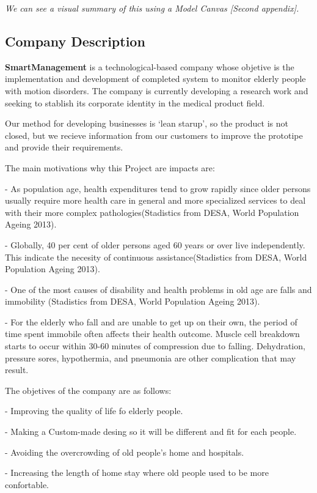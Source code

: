\textit{We can see a visual summary of this using a Model Canvas [Second appendix].}

\subsection{Company Description}
\textbf{SmartManagement} is a technological-based company whose objetive is the implementation and development of completed system to monitor elderly people with motion disorders. The company is currently developing a research work and seeking to stablish its corporate identity in the medical product field.

Our method for developing businesses is ‘lean starup’, so the product is not closed, but we recieve information from our customers to improve the prototipe and provide their requirements.

The main motivations why this Project are impacts are:

-	As population age, health expenditures tend to grow rapidly since older persons usually require more health care in general and more specialized services to deal with their more complex pathologies(Stadistics from DESA,  World Population Ageing 2013\cite{desa}).

-	Globally, 40 per cent of older persons aged 60 years or over live independently. This indicate the necesity of continuous assistance(Stadistics from DESA,  World Population Ageing 2013\cite{desa}).

-	One of the most causes of disability and health problems in old age are falls and immobility (Stadistics from DESA,  World Population Ageing 2013\cite{desa}).

-	For the elderly who fall and are unable to get up on their own, the period of time spent immobile often affects their health outcome. Muscle cell breakdown starts to occur within 30-60 minutes of compression due to falling. Dehydration, pressure sores, hypothermia, and pneumonia are other complication that may result\cite{A.Olivares2013}.

The objetives of the company are as follows:

-	Improving the quality of life fo elderly people.

-	Making a Custom-made desing so it will be different and fit for each people.

-	Avoiding the overcrowding of old people’s home and hospitals.

-	Increasing the length of home stay where old people used to be more confortable.

